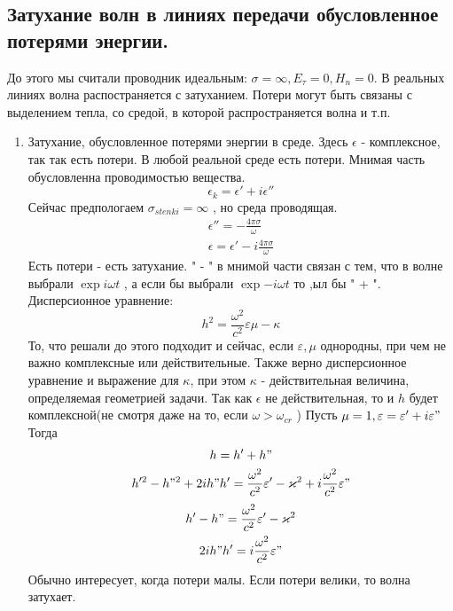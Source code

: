 \subsection{Затухание волн в линиях передачи обусловленное потерями энергии.}
До этого мы считали проводник идеальным: $\sigma = \infty, E_{\tau} = 0, H_n = 0$.
%
В реальных линиях волна распостраняется с затуханием. Потери могут быть связаны с выделением тепла, со средой, в которой распространяется волна и т.п.
%
\begin{enumerate}
	\item Затухание, обусловленное потерями энергии в среде.
	Здесь $\epsilon$ - комплексное, так так есть потери. В любой реальной среде есть потери. Мнимая часть обусловленна проводимостью вещества.
	\begin{equation}
		\epsilon_{k} = \epsilon' + i \epsilon''
	\end{equation}
	Сейчас предпологаем $\sigma_{stenki} = \infty$ , но среда проводящая.
	\begin{gather}
		\epsilon'' = - \frac{4 \pi \sigma}{\omega}\\
		\epsilon = \epsilon' - i \frac{4 \pi \sigma}{\omega}
	\end{gather}
	Есть потери - есть затухание. " - " в мнимой части связан с тем, что в волне выбрали $\exp{ i \omega t}$ , а если бы выбрали $\exp{- i \omega t}$ то ,ыл бы " + ".
	Дисперсионное уравнение:
	\begin{equation}
		h^2= \frac{\omega^2}{c^2}{\varepsilon \mu} -\kappa
	\end{equation}
	То, что решали до этого подходит и сейчас, если $\varepsilon, \mu$ однородны, при чем не важно комплексные или действительные.
	Также верно дисперсионное уравнение и выражение для $\kappa$, при этом $\kappa$ - действительная величина, определяемая геометрией задачи. Так как $\epsilon$ не действительная, то и $h$   будет комплексной(не смотря даже на то, если $\omega > \omega_{cr}$ )
	Пусть $\mu = 1, \epsilon = \epsilon' + i \epsilon"$
	Тогда 
	\begin{gather}
		h = h' + h"\\
		h'^2 - h"^2 + 2 i h" h' = \frac{\omega^2}{c^2} \epsilon' - \kappa^2 + i \frac{\omega^2}{c^2} \epsilon"
	\end{gather}
	\begin{gather}
		h' - h" = \frac{\omega^2}{c^2} \epsilon' - \kappa^2\\
		2 i h" h' = i \frac{\omega^2}{c^2} \epsilon"
	\end{gather}
	Обычно интересует, когда потери малы. Если потери велики, то волна затухает.

\end{enumerate}
